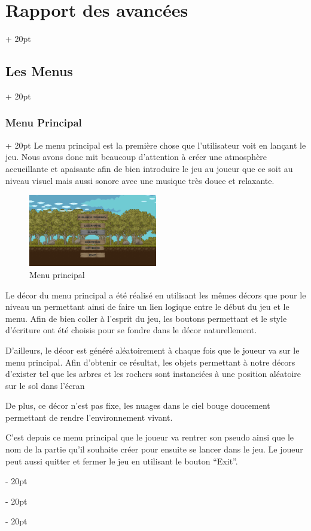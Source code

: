 \documentclass[a4paper, 12pt, twoside]{article}
\newcommand{\ind}[1][20pt]{\advance\leftskip + #1}
\newcommand{\deind}[1][20pt]{\advance\leftskip - #1}
\newenvironment{indt}[2][20pt]{#2 \par \ind[#1]}{\par \deind} %
\begin{document}
\begin{indt}{\section{Rapport des avancées}}
        \begin{indt}{\subsection{Les Menus}}
            \begin{indt}{\subsubsection{Menu Principal}}
                Le menu principal est la première chose que l’utilisateur voit en lançant le jeu. Nous avons donc mit beaucoup d’attention à créer une atmosphère accueillante et apaisante afin de bien introduire le jeu au joueur que ce soit au niveau visuel mais aussi sonore avec une musique très douce et relaxante.

                \begin{figure}[h]
                    \centering
                    \includegraphics[width=0.5\textwidth]{Menu1.png}
                    \caption{Menu principal}
                    \label{fig:mesh1}
                \end{figure}

                Le décor du menu principal a été réalisé en utilisant les mêmes décors que pour le niveau un permettant ainsi de faire un lien logique entre le début du jeu et le menu. Afin de bien coller à l’esprit du jeu, les boutons permettant et le style d'écriture ont été choisis pour se fondre dans le décor naturellement.

                D’ailleurs, le décor est généré aléatoirement à chaque fois que le joueur va sur le menu principal. Afin d’obtenir ce résultat, les objets permettant à notre décors d’exister tel que les arbres et les rochers sont instanciées à une position aléatoire sur le sol dans l’écran

                De plus, ce décor n’est pas fixe, les nuages dans le ciel bouge doucement permettant de rendre l’environnement vivant.

                C’est depuis ce menu principal que le joueur va rentrer son pseudo ainsi que le nom de la partie qu’il souhaite créer pour ensuite se lancer dans le jeu. Le joueur peut aussi quitter et fermer le jeu en utilisant le bouton “Exit”.


\end{indt}
\end{indt}
\end{indt}
\end{document}
